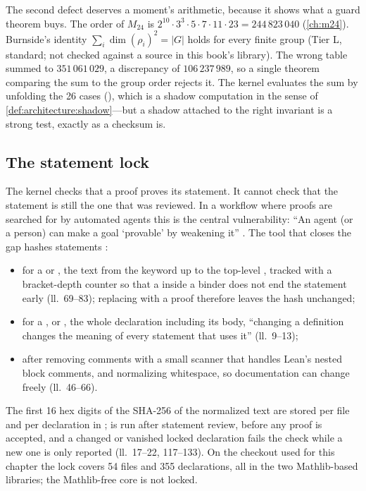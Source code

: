 The second defect deserves a moment's arithmetic, because it shows what a guard theorem
buys. The order of $M_{24}$ is $2^{10}\cdot3^3\cdot5\cdot7\cdot11\cdot23=244\,823\,040$
(\cref{ch:m24}). Burnside's identity $\sum_i\dim(\rho_i)^2=|G|$ holds for every finite group
(Tier L, standard; not checked against a source in this book's library). The wrong table
summed to $351\,061\,029$, a discrepancy of $106\,237\,989$, so a single theorem comparing
the sum to the group order rejects it. The kernel evaluates the sum by unfolding the 26
cases (), which is a shadow computation in the
sense of \cref{def:architecture:shadow}---but a shadow attached to the right invariant is a
strong test, exactly as a checksum is.

\subsection{The statement lock}\label{sec:architecture:lock}

The kernel checks that a proof proves its statement. It cannot check that the statement is
still the one that was reviewed. In a workflow where proofs are searched for by automated
agents this is the central vulnerability: ``An agent (or a person) can make a goal
`provable' by weakening it'' . The tool that
closes the gap hashes statements :
\begin{itemize}[leftmargin=*,itemsep=1pt]
\item for a  or , the text from the keyword up to the top-level
  \lean{:=}, tracked with a bracket-depth counter so that a \lean{:=} inside a binder does
  not end the statement early (ll.~69--83); replacing  with a proof
  therefore leaves the hash unchanged;
\item for a ,  or , the whole declaration including
  its body, ``changing a definition changes the meaning of every statement that uses it''
  (ll.~9--13);
\item after removing comments with a small scanner that handles Lean's nested block
  comments, and normalizing whitespace, so documentation can change freely (ll.~46--66).
\end{itemize}
The first 16 hex digits of the SHA-256 of the normalized text are stored per file and per
declaration in ;  is run after statement
review,  before any proof is accepted, and a changed or vanished locked
declaration fails the check while a new one is only reported (ll.~17--22, 117--133). On the
checkout used for this chapter the lock covers 54 files and 355 declarations, all in the
two Mathlib-based libraries; the Mathlib-free core is not locked.

